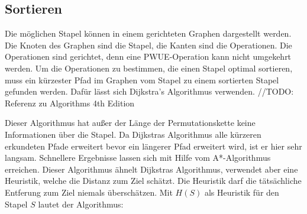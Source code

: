 \documentclass[a4paper,10pt,ngerman]{scrartcl}
\begin{document}
\subsection{Sortieren}
Die möglichen Stapel können in einem gerichteten Graphen dargestellt werden. Die Knoten des Graphen
sind die Stapel, die Kanten sind die Operationen. Die Operationen sind gerichtet, denn eine PWUE-Operation
kann nicht umgekehrt werden. Um die Operationen zu bestimmen, die einen Stapel optimal sortieren, muss
ein kürzester Pfad im Graphen vom Stapel zu einem sortierten Stapel gefunden werden. Dafür lässt sich
Dijkstra's Algorithmus verwenden. //TODO: Referenz zu Algorithms 4th Edition
\begin{algorithmic}
      \EndIf
        \EndIf
      \EndFor
    \EndWhile
  \EndProcedure
\end{algorithmic}
Dieser Algorithmus hat außer der Länge der Permutationskette keine Informationen über die Stapel.
Da Dijkstras Algorithmus alle kürzeren erkundeten Pfade erweitert bevor ein längerer Pfad erweitert
wird, ist er hier sehr langsam. Schnellere Ergebnisse lassen sich mit Hilfe vom A*-Algorithmus erreichen.
Dieser Algorithmus ähnelt Dijkstras Algorithmus, verwendet aber eine Heuristik, welche die Distanz zum
Ziel schätzt. Die Heuristik darf die tätsächliche Entferung zum Ziel niemals überschätzen. Mit $H(S)$ als Heuristik
für den Stapel $S$ lautet der Algorithmus:\\\\
\begin{algorithmic}
      \EndIf
        \EndIf
      \EndFor
    \EndWhile
  \EndProcedure
\end{algorithmic}
\end{document}
